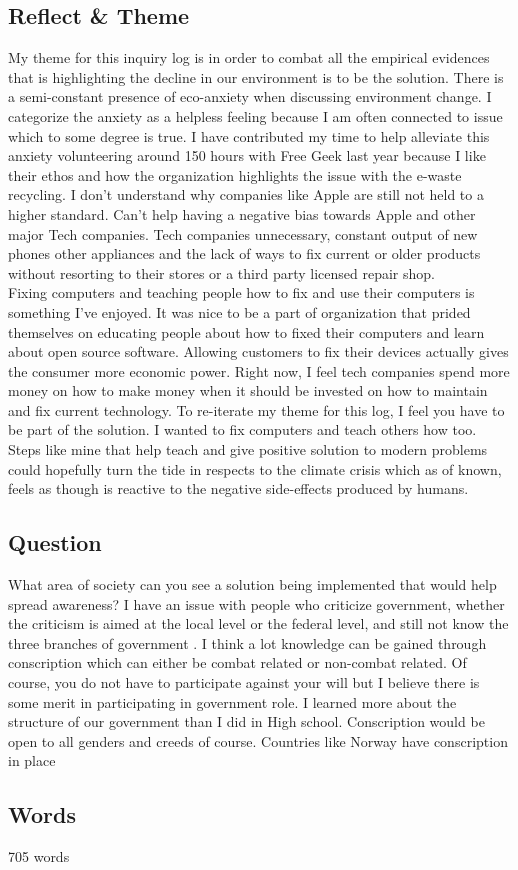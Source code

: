 \documentclass[a4paper,man,biblatex]{apa6}
\begin{document}
\subsection{Reflect \& Theme} My theme for this inquiry log is in order to combat all the empirical evidences that is highlighting the decline in our environment is to be the solution. There is a semi-constant presence of eco-anxiety when discussing environment change. I categorize the anxiety as a helpless feeling because I am often connected to issue which to some degree is true. I have contributed my time to help alleviate this anxiety volunteering around 150 hours with Free Geek last year because I like their ethos and how the organization highlights the issue with the e-waste recycling. I don't understand why companies like Apple are still not held to a higher standard. Can't help having a negative bias towards Apple  and other major Tech companies. Tech companies unnecessary, constant output of new phones other appliances and the lack of ways to fix current or older products without resorting to their stores or a third party licensed repair shop.\\Fixing computers and teaching people how to fix and use their computers is something I've enjoyed. It was nice to be a part of organization that prided themselves on educating people about how to fixed their computers and learn about open source software. Allowing customers to fix their devices actually gives the consumer more economic power. Right now, I feel tech companies spend more money on how to make money when it should be invested on how to maintain and fix current technology. To re-iterate my theme for this log, I feel you have to be part of the solution. I wanted to fix computers and teach others how too. Steps like mine that help teach and give positive solution to modern problems could hopefully turn the tide in respects to the climate crisis which as of known, feels as though is reactive to the negative side-effects produced by humans.   

\subsection{Question}  What area of society can you see a solution being implemented that would help spread awareness? I have an issue with people who criticize government, whether the criticism is aimed at the local level or the federal level, and still not know the three branches of government \autocite{branchessurvey}. I think a lot knowledge can be gained through conscription which can either be combat related or non-combat related. Of course, you do not have to participate against your will but I believe there is some merit in participating in government role. I learned more about the structure of our government than I did in High school. Conscription would be open to all genders and creeds of course. Countries like Norway have conscription in place \autocite{norwayconscript}

\subsection{Words}  705 words

\printbibliography
\end{document}
